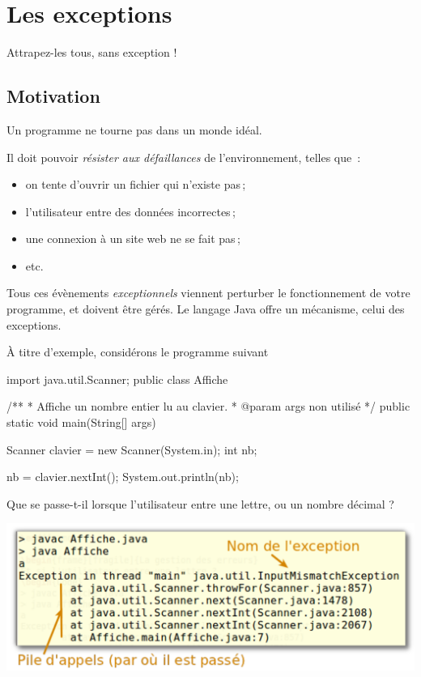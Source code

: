 \chapter{Les exceptions}
\label{chap:exceptions}

\begin{Exergue}
	\og{}Attrapez-les tous, sans exception !\fg{}
\end{Exergue}

\minitoc

\section{Motivation}
Un programme ne tourne pas dans un monde idéal.

Il doit pouvoir \emph{résister aux défaillances} de l'environnement, telles que~:
  \begin{itemize}
  \item on tente d'ouvrir un fichier qui n'existe pas\,;
  \item l'utilisateur entre des données incorrectes\,;
  \item une connexion à un site web ne se fait pas\,;
  \item etc.
  \end{itemize}

  Tous ces évènements \emph{exceptionnels} viennent perturber le fonctionnement de votre programme, et doivent être gérés. Le langage Java offre un mécanisme, celui des exceptions.

À titre d'exemple, considérons le programme suivant

\begin{java}
import java.util.Scanner;
public class Affiche {
  /**
   * Affiche un nombre entier lu au clavier.
   * @param args non utilisé
   */
  public static void main(String[] args) {
    Scanner clavier = new Scanner(System.in);
    int nb;

    nb = clavier.nextInt();
    System.out.println(nb);
  }
}
\end{java}

Que se passe-t-il lorsque l'utilisateur entre une lettre, ou un nombre décimal ?

\begin{center}
\includegraphics[scale=0.65]{images/exception-InputMismatchException.pdf}
\end{center}

